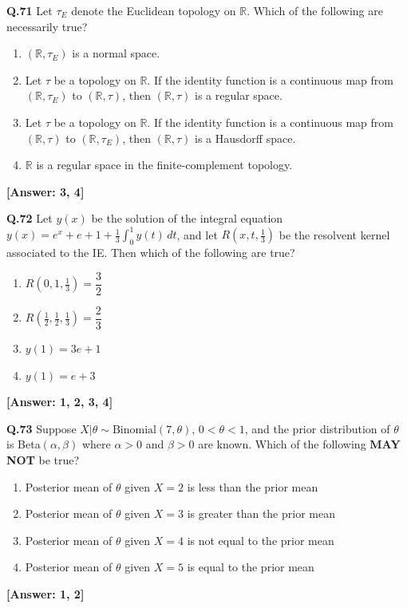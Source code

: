 \documentclass[12pt,a4paper]{article}
\newcommand{\ans}[1]{\quad\textcolor{anscolor}{\textbf{[Answer: #1]}}}
\begin{document}
\textbf{Q.71} Let $\tau_E$ denote the Euclidean topology on $\mathbb{R}$. Which of the following are necessarily true?
\begin{enumerate}[label=\arabic*.]
\item $(\mathbb{R},\tau_E)$ is a normal space.
\item Let $\tau$ be a topology on $\mathbb{R}$. If the identity function is a continuous map from $(\mathbb{R},\tau_E)$ to $(\mathbb{R},\tau)$, then $(\mathbb{R},\tau)$ is a regular space.
\item Let $\tau$ be a topology on $\mathbb{R}$. If the identity function is a continuous map from $(\mathbb{R},\tau)$ to $(\mathbb{R},\tau_E)$, then $(\mathbb{R},\tau)$ is a Hausdorff space.
\item $\mathbb{R}$ is a regular space in the finite-complement topology.
\end{enumerate}\ans{3, 4}

\textbf{Q.72} Let $y(x)$ be the solution of the integral equation $y(x)=e^x+e+1+\tfrac{1}{3}\int_0^1y(t)\,dt$, and let $R\!\left(x,t,\tfrac{1}{3}\right)$ be the resolvent kernel associated to the IE. Then which of the following are true?
\begin{enumerate}[label=\arabic*.]
\item $R\!\left(0,1,\tfrac{1}{3}\right)=\dfrac{3}{2}$
\item $R\!\left(\tfrac{1}{2},\tfrac{1}{2},\tfrac{1}{3}\right)=\dfrac{2}{3}$
\item $y(1)=3e+1$
\item $y(1)=e+3$
\end{enumerate}\ans{1, 2, 3, 4}

\textbf{Q.73} Suppose $X|\theta\sim\text{Binomial}(7,\theta)$, $0<\theta<1$, and the prior distribution of $\theta$ is Beta$(\alpha,\beta)$ where $\alpha>0$ and $\beta>0$ are known. Which of the following \textbf{MAY NOT} be true?
\begin{enumerate}[label=\arabic*.]
\item Posterior mean of $\theta$ given $X=2$ is less than the prior mean
\item Posterior mean of $\theta$ given $X=3$ is greater than the prior mean
\item Posterior mean of $\theta$ given $X=4$ is not equal to the prior mean
\item Posterior mean of $\theta$ given $X=5$ is equal to the prior mean
\end{enumerate}\ans{1, 2}
\end{document}
